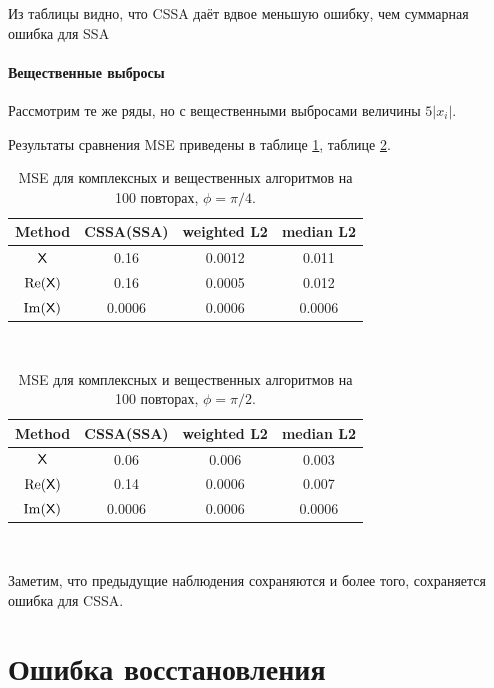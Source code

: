 \documentclass[specialist,
               substylefile = spbu.rtx,
               subf,href,colorlinks=true, 12pt]{disser}
\begin{document}
Из таблицы видно, что CSSA даёт вдвое меньшую ошибку, чем суммарная ошибка для SSA

\subsubsection{Вещественные выбросы}
Рассмотрим те же ряды, но с вещественными выбросами величины $5|x_i|$.

Результаты сравнения MSE приведены в таблице \ref{tab:re_outl}, таблице \ref{tab:re_outl_exp}.
\begin{table}[H]
	\caption{MSE для комплексных и вещественных алгоритмов на 100 повторах, $\phi = \pi/4$.}
	\label{tab:re_outl}
	\begin{center}
		\begin{tabular}{|c|c|c|c|}
			\hline
			Method & CSSA(SSA) & weighted L2 & median L2\\ 
			\hline
			$\textsf{X}$ & 0.16 & 0.0012 & 0.011\\
			\hline
			$\Re(\textsf{X})$ & 0.16 & 0.0005 &   0.012\\
			\hline
			$\Im(\textsf{X})$ & 0.0006   & 0.0006 &   0.0006\\
			\hline
		\end{tabular} \\
	\end{center}
\end{table}

\begin{table}[H]
	\caption{MSE для комплексных и вещественных алгоритмов на 100 повторах, $\phi = \pi/2$.}
	\label{tab:re_outl_exp}
	\begin{center}
		\begin{tabular}{|c|c|c|c|}
			\hline
			Method & CSSA(SSA) & weighted L2 & median L2\\ 
			\hline
			$\textsf{X}$ & 0.06 & 0.006 & 0.003\\
			\hline
			$\Re(\textsf{X})$ & 0.14 & 0.0006 &   0.007\\
			\hline
			$\Im(\textsf{X})$ & 0.0006   & 0.0006 &   0.0006\\
			\hline
		\end{tabular} \\
	\end{center}
\end{table}

Заметим, что предыдущие наблюдения сохраняются и более того, сохраняется ошибка для CSSA. 

\chapter{Ошибка восстановления}
\end{document}
